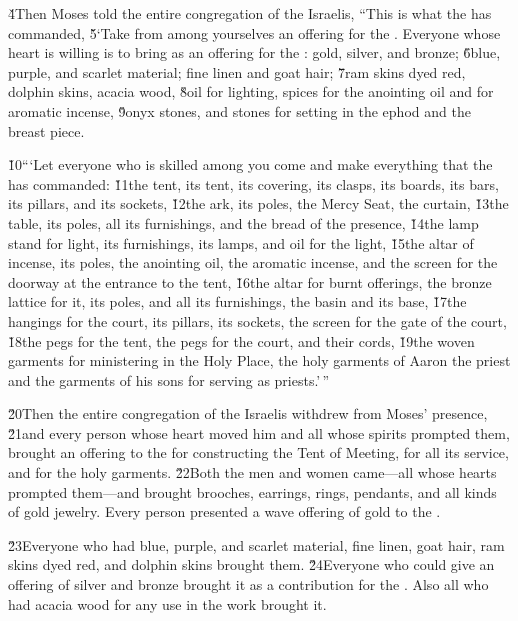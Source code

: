 \v{4}Then Moses told the entire congregation of the Israelis, ``This is what the  has commanded, \v{5}`Take from among yourselves an offering for the . Everyone whose heart is willing is to bring as an offering for the : gold, silver, and bronze; \v{6}blue, purple, and scarlet material; fine linen and goat hair; \v{7}ram skins dyed red, dolphin skins, acacia wood, \v{8}oil for lighting, spices for the anointing oil and for aromatic incense, \v{9}onyx stones, and stones for setting in the ephod and the breast piece.

\v{10}```Let everyone who is skilled among you come and make everything that the  has commanded: \v{11}the tent, its tent, its covering, its clasps, its boards, its bars, its pillars, and its sockets, \v{12}the ark, its poles, the Mercy Seat, the curtain, \v{13}the table, its poles, all its furnishings, and the bread of the presence, \v{14}the lamp stand for light, its furnishings, its lamps, and oil for the light, \v{15}the altar of incense, its poles, the anointing oil, the aromatic incense, and the screen for the doorway at the entrance to the tent, \v{16}the altar for burnt offerings, the bronze lattice for it, its poles, and all its furnishings, the basin and its base, \v{17}the hangings for the court, its pillars, its sockets, the screen for the gate of the court, \v{18}the pegs for the tent, the pegs for the court, and their cords, \v{19}the woven garments for ministering in the Holy Place, the holy garments of Aaron the priest and the garments of his sons for serving as priests.'\,''

\v{20}Then the entire congregation of the Israelis withdrew from Moses' presence, \v{21}and every person whose heart moved him and all whose spirits prompted them, brought an offering to the  for constructing the Tent of Meeting, for all its service, and for the holy garments. \v{22}Both the men and women came---all whose hearts prompted them---and brought brooches, earrings, rings, pendants, and all kinds of gold jewelry. Every person presented a wave offering of gold to the .

\v{23}Everyone who had blue, purple, and scarlet material, fine linen, goat hair, ram skins dyed red, and dolphin skins brought them. \v{24}Everyone who could give an offering of silver and bronze brought it as a contribution for the . Also all who had acacia wood for any use in the work brought it.

